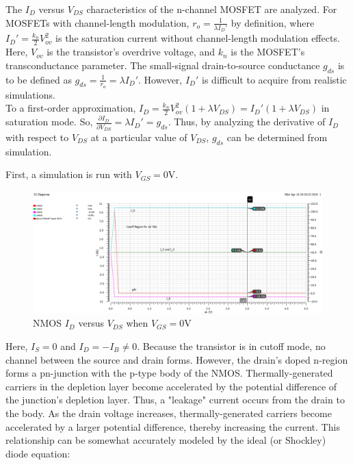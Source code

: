 The $I_{D}$ versus $V_{DS}$ characteristics of the n-channel MOSFET are analyzed.
For MOSFETs with channel-length modulation, $r_{o} = \frac{1}{\lambda I_{D}'}$ by definition, where $I_{D}' = \frac{k_{n}}{2} V_{ov}^2$ is the saturation current without channel-length modulation effects.
Here, $V_{ov}$ is the transistor's overdrive voltage, and $k_{n}$ is the MOSFET's transconductance parameter.
The small-signal drain-to-source conductance $g_{ds}$ is to be defined as $g_{ds} = \frac{1}{r_{o}} = \lambda I_{D}'$.
However, $I_{D}'$ is difficult to acquire from realistic simulations. \\

To a first-order approximation, $I_{D} = \frac{k_{n}}{2} V_{ov}^2 ( 1 + \lambda V_{DS} ) = I_{D}' ( 1 + \lambda V_{DS} )$ in saturation mode.
So, $\frac{ \partial I_{D} }{ \partial V_{DS} } = \lambda I_{D}' = g_{ds}$.
Thus, by analyzing the derivative of $I_{D}$ with respect to $V_{DS}$ at a particular value of $V_{DS}$, $g_{ds}$ can be determined from simulation.

First, a simulation is run with $V_{GS} = 0$\si{\volt}.


\FloatBarrier

\begin{figure}[h!]
	\centering
	\includegraphics[scale=0.75]{../images/id_vs_vds_vgs_is_0.PNG}
	\caption{NMOS $I_{D}$ versus $V_{DS}$ when $V_{GS} = 0$\si{\volt}}
	\label{fig:id_vs_vds_vgs_is_0}
\end{figure}

\FloatBarrier

Here, $I_{S} = 0$ and $I_{D} = -I_{B} \neq 0$.
Because the transistor is in cutoff mode, no channel between the source and drain forms.
However, the drain's doped n-region forms a pn-junction with the p-type body of the NMOS.
Thermally-generated carriers in the depletion layer become accelerated by the potential difference of the junction's depletion layer.
Thus, a "leakage" current occurs from the drain to the body.
As the drain voltage increases, thermally-generated carriers become accelerated by a larger potential difference, thereby increasing the current.
This relationship can be somewhat accurately modeled by the ideal (or Shockley) diode equation:

